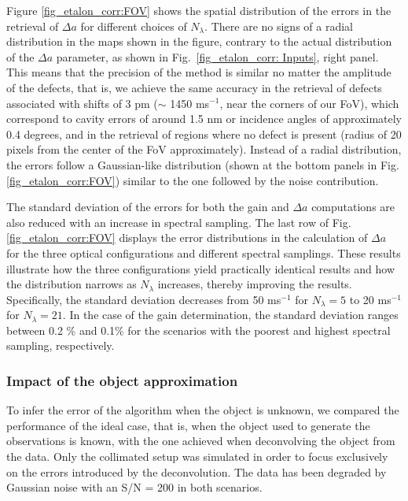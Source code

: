 Figure \ref{fig_etalon_corr:FOV} shows the spatial distribution of the errors in the retrieval of $\Delta a$ for different choices of $N_\lambda$. There are no signs of a radial distribution in the maps shown in the figure, contrary to the actual distribution of the $\Delta a$ parameter, as shown in Fig.~\ref{fig_etalon_corr: Inputs}, right panel. This means that the precision of the method is similar no matter the amplitude of the defects, that is, we achieve the same accuracy in the retrieval of defects associated with shifts of 3 pm ($\sim$ 1450 ms$^{-1}$, near the corners of our FoV), which correspond to cavity errors of around 1.5 nm or incidence angles of approximately 0.4 degrees, and in the retrieval of regions where no defect is present (radius of 20 pixels from the center of the FoV approximately). Instead of a radial distribution, the errors follow a Gaussian-like distribution (shown at the bottom panels in Fig.\ref{fig_etalon_corr:FOV}) similar to the one followed by the noise contribution.

The standard deviation of the errors for both the gain and $\Delta a$ computations are also reduced with an increase in spectral sampling. The last row of Fig. \ref{fig_etalon_corr:FOV} displays the error distributions in the calculation of  $\Delta a$ for the three optical configurations and different spectral samplings. These results illustrate how the three configurations yield practically identical results and how the distribution narrows as $N_\lambda$ increases, thereby improving the results. Specifically, the standard deviation decreases from 50 ms$^{-1}$ for $N_\lambda = 5$ to 20 ms$^{-1}$ for $N_\lambda = 21$. In the case of the gain determination, the standard deviation ranges between 0.2 \% and 0.1\% for the scenarios with the poorest and highest spectral sampling, respectively.

\subsubsection{\label{sect: fitting_deconv}Impact of the object approximation}

To infer the error of the algorithm when the object is unknown, we compared the performance of the ideal case, that is, when the object used to generate the observations is known, with the one achieved when deconvolving the object from the data. Only the collimated setup was simulated in order to focus exclusively on the errors introduced by the deconvolution. The data has been degraded by Gaussian noise with an S/N = 200 in both scenarios. 

